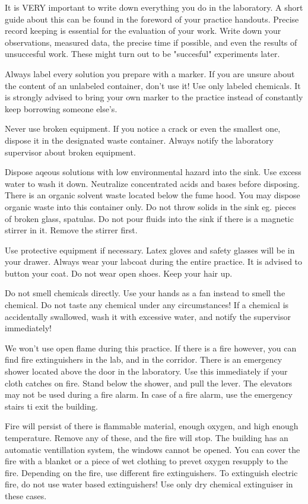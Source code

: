 \documentclass{article}
\begin{document}
It is VERY important to write down everything you do in the laboratory. A short guide about this can be found in the foreword of your practice handouts. Precise record keeping is essential for the evaluation of your work. Write down your observations, measured data, the precise time if possible, and even the results of unsuccesful work. These might turn out to be "succesful" experiments later.

Always label every solution you prepare with a marker. If you are unsure about the content of an unlabeled container, don't use it! Use only labeled chemicals. It is strongly advised to bring your own marker to the practice instead of constantly keep borrowing someone else's.

Never use broken equipment. If you notice a crack or even the smallest one, dispose it in the designated waste container. Always notify the laboratory supervisor about broken equipment.

Dispose aqeous solutions with low environmental hazard into the sink. Use excess water to wash it down. Neutralize concentrated acids and bases before disposing. There is an organic solvent waste located below the fume hood. You may dispose organic waste into this container only. Do not throw solids in the sink eg. pieces of broken glass, spatulas. Do not pour fluids into the sink if there is a magnetic stirrer in it. Remove the stirrer first.

Use protective equipment if necessary. Latex gloves and  safety glasses will be in your drawer. Always wear your labcoat during the entire practice. It is advised to button your coat. Do not wear open shoes. Keep your hair up.

Do not smell chemicals directly. Use your hands as a fan instead to smell the chemical. Do not taste any chemical under any circumstances! If a chemical is accidentally swallowed, wash it with excessive water, and notify the supervisor immediately!

We won't use open flame during this practice. If there is a fire however, you can find fire extinguishers in the lab, and in the corridor. There is an emergency shower located above the door in the laboratory. Use this immediately if your cloth catches on fire. Stand below the shower, and pull the lever. The elevators may not be used during a fire alarm. In case of a fire alarm, use the emergency stairs ti exit the building.

Fire will persist of there is flammable material, enough oxygen, and high enough temperature. Remove any of these, and the fire will stop. The building has an automatic ventillation system, the windows cannot be opened. You can cover the fire with a blanket or a piece of wet clothing to prevet oxygen resupply to the fire. Depending on the fire, use different fire extinguishers. To extinguish electric fire, do not use water based extinguishers! Use only dry chemical extinguiser in these cases.
\end{document}
